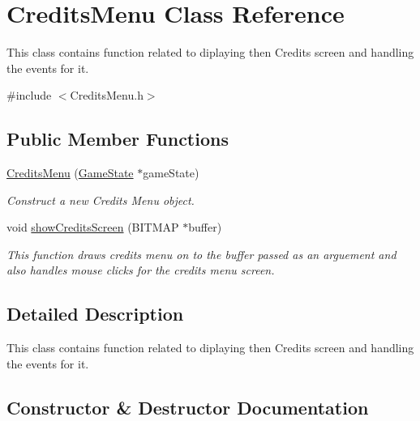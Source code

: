 \hypertarget{class_credits_menu}{}\section{Credits\+Menu Class Reference}
\label{class_credits_menu}


This class contains function related to diplaying then Credits screen and handling the events for it.  




{\ttfamily \#include $<$Credits\+Menu.\+h$>$}

\subsection*{Public Member Functions}
\begin{DoxyCompactItemize}
\item 
\mbox{\hyperlink{class_credits_menu_aba2b21ca53e97554f94cb09b2e59b29e}{Credits\+Menu}} (\mbox{\hyperlink{struct_game_state}{Game\+State}} $\ast$game\+State)
\begin{DoxyCompactList}\small\item\em Construct a new Credits Menu object. \end{DoxyCompactList}\item 
void \mbox{\hyperlink{class_credits_menu_a11a0ae472348a21828d972ad0966203b}{show\+Credits\+Screen}} (B\+I\+T\+M\+AP $\ast$buffer)
\begin{DoxyCompactList}\small\item\em This function draws credits menu on to the buffer passed as an arguement and also handles mouse clicks for the credits menu screen. \end{DoxyCompactList}\end{DoxyCompactItemize}


\subsection{Detailed Description}
This class contains function related to diplaying then Credits screen and handling the events for it. 



\subsection{Constructor \& Destructor Documentation}
\mbox{\label{class_credits_menu_aba2b21ca53e97554f94cb09b2e59b29e}} 
